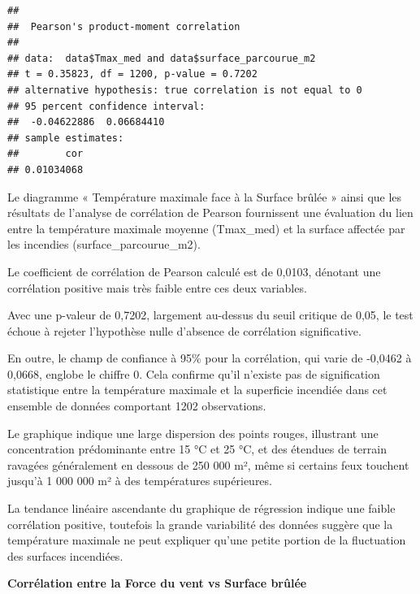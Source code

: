 \documentclass[
]{article}
\begin{document}
\begin{verbatim}
## 
##  Pearson's product-moment correlation
## 
## data:  data$Tmax_med and data$surface_parcourue_m2
## t = 0.35823, df = 1200, p-value = 0.7202
## alternative hypothesis: true correlation is not equal to 0
## 95 percent confidence interval:
##  -0.04622886  0.06684410
## sample estimates:
##        cor 
## 0.01034068
\end{verbatim}

Le diagramme « Température maximale face à la Surface brûlée » ainsi que
les résultats de l'analyse de corrélation de Pearson fournissent une
évaluation du lien entre la température maximale moyenne (Tmax\_med) et
la surface affectée par les incendies (surface\_parcourue\_m2).

Le coefficient de corrélation de Pearson calculé est de 0,0103, dénotant
une corrélation positive mais très faible entre ces deux variables.

Avec une p-valeur de 0,7202, largement au-dessus du seuil critique de
0,05, le test échoue à rejeter l'hypothèse nulle d'absence de
corrélation significative.

En outre, le champ de confiance à 95\% pour la corrélation, qui varie de
-0,0462 à 0,0668, englobe le chiffre 0. Cela confirme qu'il n'existe pas
de signification statistique entre la température maximale et la
superficie incendiée dans cet ensemble de données comportant 1202
observations.

Le graphique indique une large dispersion des points rouges, illustrant
une concentration prédominante entre 15 °C et 25 °C, et des étendues de
terrain ravagées généralement en dessous de 250 000 m², même si certains
feux touchent jusqu'à 1 000 000 m² à des températures supérieures.

La tendance linéaire ascendante du graphique de régression indique une
faible corrélation positive, toutefois la grande variabilité des données
suggère que la température maximale ne peut expliquer qu'une petite
portion de la fluctuation des surfaces incendiées.

\textbf{Corrélation entre la Force du vent vs Surface brûlée}
\end{document}
